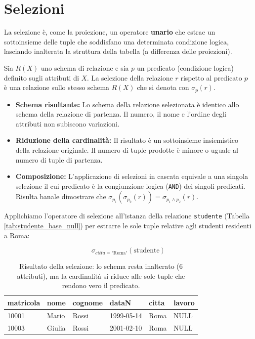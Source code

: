 \section{Selezioni}

La selezione è, come la proiezione,  un operatore \textbf{unario} che estrae un sottoinsieme delle tuple che soddisfano una determinata condizione logica, lasciando inalterata la struttura della tabella (a differenza delle proiezioni).

Sia $R(X)$ uno schema di relazione e sia $p$ un predicato (condizione logica) definito sugli attributi di $X$. La selezione della relazione $r$ rispetto al predicato $p$ è una relazione sullo stesso schema $R(X)$ che si denota con $\sigma_p(r)$.

\begin{itemize}
    \item \textbf{Schema risultante:} Lo schema della relazione selezionata è identico allo schema della relazione di partenza. Il numero, il nome e l'ordine degli attributi non subiscono variazioni.
    \item \textbf{Riduzione della cardinalità:} Il risultato è un sottoinsieme insiemistico della relazione originale. Il numero di tuple prodotte è minore o uguale al numero di tuple di partenza.
    \item \textbf{Composizione:} L'applicazione di selezioni in cascata equivale a una singola selezione il cui predicato è la congiunzione logica (\texttt{AND}) dei singoli predicati. Risulta banale dimostrare che $\sigma_{p_1}(\sigma_{p_2}(r)) = \sigma_{p_1 \land p_2}(r)$.
\end{itemize}

\begin{example}
    Applichiamo l'operatore di selezione all'istanza della relazione \texttt{studente} (Tabella \ref{tab:studente_base_null}) per estrarre le sole tuple relative agli studenti residenti a Roma:
    
    $$ \sigma_{citta = '\text{Roma}'}(\text{studente}) $$
    
    \begin{table}[H]
        \centering
        \renewcommand{\arraystretch}{1.2}
        \begin{tabular}{llllll}
            \toprule
            \textbf{matricola} & \textbf{nome} & \textbf{cognome} & \textbf{dataN} & \textbf{citta} &\textbf{lavoro} \\
            \midrule
            10001 & Mario  & Rossi   & 1999-05-14 & Roma & NULL \\
            10003 & Giulia & Rossi   & 2001-02-10 & Roma & NULL\\
            \bottomrule
        \end{tabular}
        \caption{Risultato della selezione: lo schema resta inalterato (6 attributi), ma la cardinalità si riduce alle sole tuple che rendono vero il predicato.}
    \end{table}
\end{example}

